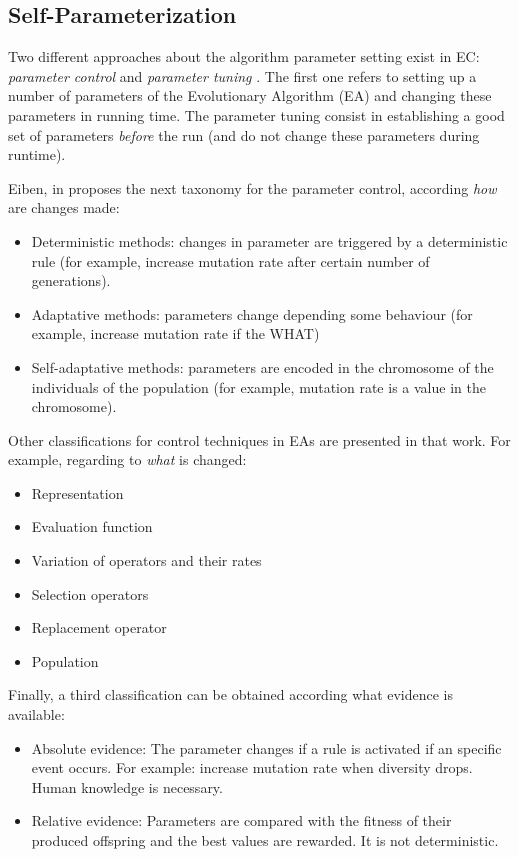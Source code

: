 \subsection{Self-Parameterization}

Two different approaches about the algorithm parameter setting exist in EC: {\em parameter control} and {\em parameter tuning} \cite{ParameterControlEiben99}. The first one refers to setting up a number of parameters of the Evolutionary Algorithm (EA) and changing these parameters in running time. The parameter tuning consist in establishing a good set of parameters {\em before} the run (and do not change these parameters during runtime).

Eiben, in \cite{ParameterControlEiben07} proposes the next taxonomy for the parameter control, according {\em how} are changes made:
\begin{itemize}
\item Deterministic methods: changes in parameter are triggered by a deterministic rule (for example, increase mutation rate after certain number of generations).
\item Adaptative methods: parameters change depending some behaviour (for example, increase mutation rate if the WHAT)
\item Self-adaptative methods: parameters are encoded in the chromosome of the individuals of the population (for example, mutation rate is a value in the chromosome).
\end{itemize}

Other classifications for control techniques in EAs are presented in that work. For example, regarding to {\em what} is changed:
\begin{itemize}
\item Representation
\item Evaluation function
\item Variation of operators and their rates
\item Selection operators
\item Replacement operator
\item Population
\end{itemize}

Finally, a third classification can be obtained according what evidence is available:
\begin{itemize}
\item Absolute evidence: The parameter changes if a rule is activated if an specific event occurs. For example: increase mutation rate when diversity drops. Human knowledge is necessary.
\item Relative evidence: Parameters are compared with the fitness of their produced offspring and the best values are rewarded. It is not deterministic.
\end{itemize}

